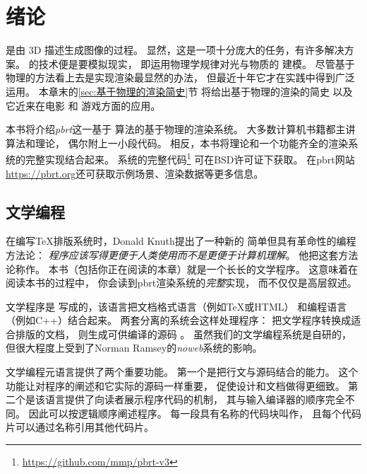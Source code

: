 
\chapter{绪论}\label{chap:绪论}

是由
3D
描述生成图像的过程。
显然，这是一项十分庞大的任务，有许多解决方案。
的技术便是要模拟现实，
即运用物理学规律对光与物质的
建模。
尽管基于物理的方法看上去是实现渲染最显然的办法，
但最近十年它才在实践中得到广泛运用。
本章末的\ref{sec:基于物理的渲染简史}节
将给出基于物理的渲染的简史
以及它近来在电影
和
游戏方面的应用。

本书将介绍\emph{pbrt}这一基于
算法的基于物理的渲染系统。
大多数计算机书籍都主讲算法和理论，
偶尔附上一小段代码。
相反，本书将理论和一个功能齐全的渲染系统的完整实现结合起来。
系统的完整代码\footnote{\url{https://github.com/mmp/pbrt-v3}}
可在BSD许可证下获取。
在pbrt网站\url{https://pbrt.org}还可获取示例场景、渲染数据等更多信息。


\section{文学编程}\label{sec:文学编程}

在编写\TeX 排版系统时，Donald Knuth提出了一种新的
简单但具有革命性的编程方法论：
\emph{程序应该写得更便于人类使用而不是更便于计算机理解}。
他把这套方法论称作。
本书（包括你正在阅读的本章）就是一个长长的文学程序。
这意味着在阅读本书的过程中，
你会读到pbrt渲染系统的\emph{完整}实现，
而不仅仅是高层叙述。

文学程序是
写成的，该语言把文档格式语言（例如\TeX 或HTML）
和编程语言（例如C++）结合起来。
两套分离的系统会这样处理程序：
把文学程序转换成适合排版的文档，
则生成可供编译的源码
。
虽然我们的文学编程系统是自研的，
但很大程度上受到了Norman Ramsey的\emph{noweb}系统的影响。

文学编程元语言提供了两个重要功能。
第一个是把行文与源码结合的能力。
这个功能让对程序的阐述和它实际的源码一样重要，
促使设计和文档做得更细致。
第二个是该语言提供了向读者展示程序代码的机制，
其与输入编译器的顺序完全不同。
因此可以按逻辑顺序阐述程序。
每一段具有名称的代码块叫作，
且每个代码片可以通过名称引用其他代码片。

